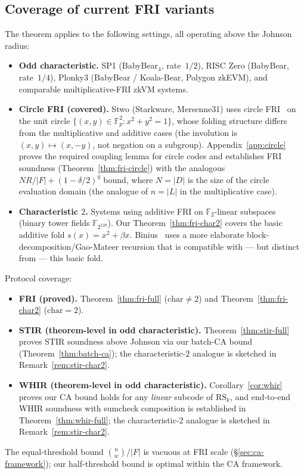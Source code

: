 \documentclass[11pt]{article}
\newcommand{\FF}{\mathbb{F}}
\newcommand{\RS}{\mathrm{RS}}
\begin{document}
\subsection{Coverage of current FRI variants}
\label{sec:coverage}

The theorem applies to the following settings, all operating above the Johnson radius:
\begin{itemize}[nosep]
\item \textbf{Odd characteristic.} SP1 (BabyBear$_4$, rate~$1/2$), RISC Zero (BabyBear, rate~$1/4$), Plonky3 (BabyBear / Koala-Bear, Polygon zkEVM), and comparable multiplicative-FRI zkVM systems.
\item \textbf{Circle FRI (covered).} Stwo (Starkware, Mersenne31) uses circle FRI~\cite{CircleSTARKs} on the unit circle $\{(x,y) \in \FF_p^2 : x^2 + y^2 = 1\}$, whose folding structure differs from the multiplicative and additive cases (the involution is $(x,y) \mapsto (x,-y)$, not negation on a subgroup). Appendix~\ref{app:circle} proves the required coupling lemma for circle codes and establishes FRI soundness (Theorem~\ref{thm:fri-circle}) with the analogous $NR/|F| + (1{-}\delta/2)^q$ bound, where $N = |D|$ is the size of the circle evaluation domain (the analogue of $n = |L|$ in the multiplicative case).
\item \textbf{Characteristic $2$.} Systems using additive FRI on $\FF_2$-linear subspaces (binary tower fields $\FF_{2^{128}}$). Our Theorem~\ref{thm:fri-char2} covers the basic additive fold $s(x) = x^2 + \beta x$. Binius~\cite{FRIBinius} uses a more elaborate block-decomposition/Gao-Mateer recursion that is compatible with --- but distinct from --- this basic fold.
\end{itemize}
Protocol coverage:
\begin{itemize}[nosep]
\item \textbf{FRI (proved).} Theorem~\ref{thm:fri-full} ($\mathrm{char} \neq 2$) and Theorem~\ref{thm:fri-char2} ($\mathrm{char} = 2$).
\item \textbf{STIR (theorem-level in odd characteristic).} Theorem~\ref{thm:stir-full} proves STIR soundness above Johnson via our batch-CA bound (Theorem~\ref{thm:batch-ca}); the characteristic-$2$ analogue is sketched in Remark~\ref{rem:stir-char2}.
\item \textbf{WHIR (theorem-level in odd characteristic).} Corollary~\ref{cor:whir} proves our CA bound holds for any \emph{linear} subcode of $\RS_k$, and end-to-end WHIR soundness with sumcheck composition is established in Theorem~\ref{thm:whir-full}; the characteristic-$2$ analogue is sketched in Remark~\ref{rem:stir-char2}.
\end{itemize}
The equal-threshold bound $\binom{n}{w}/|F|$ is vacuous at FRI scale (\S\ref{sec:ca-framework}); our half-threshold bound is optimal within the CA framework.
\end{document}
